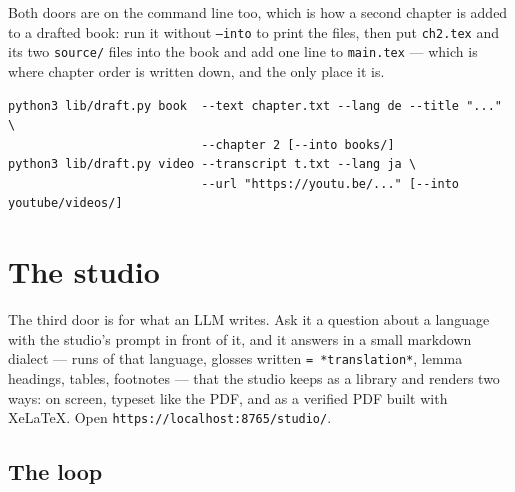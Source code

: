 \documentclass[11pt,oneside]{report}
\newcommand{\file}[1]{\texttt{#1}}
\begin{document}
\begin{goodbox}
Both doors are on the command line too, which is how a second chapter is
added to a drafted book: run it without \texttt{--into} to print the files,
then put \file{ch2.tex} and its two \file{source/} files into the book and add
one \verb|| line to \file{main.tex} --- which is where chapter order is
written down, and the only place it is.

\begin{lstlisting}
python3 lib/draft.py book  --text chapter.txt --lang de --title "..." \
                           --chapter 2 [--into books/]
python3 lib/draft.py video --transcript t.txt --lang ja \
                           --url "https://youtu.be/..." [--into youtube/videos/]
\end{lstlisting}
\end{goodbox}

\chapter{The studio}
\label{ch:studio}

The third door is for what an LLM writes. Ask it a question about a language
with the studio's prompt in front of it, and it answers in a small markdown
dialect --- runs of that language, glosses written \texttt{= *translation*},
lemma headings, tables, footnotes --- that the studio keeps as a library and
renders two ways: on screen, typeset like the PDF, and as a verified PDF
built with XeLaTeX. Open \texttt{https://localhost:8765/studio/}.

\section{The loop}
\label{sec:loop}
\end{document}
